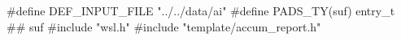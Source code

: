 \begin{code}
#define DEF\_INPUT\_FILE "../../data/ai"
#define PADS\_TY(suf) entry\_t ## suf
#include "wsl.h"
#include "template/accum\_report.h"
\end{code}
